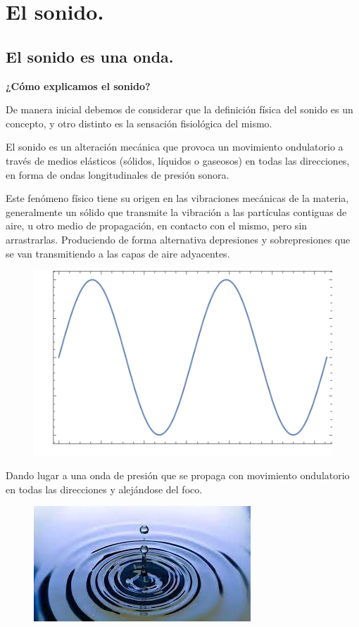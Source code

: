 \documentclass[12pt, letter]{article}
\begin{document}
\section{El sonido.}

\subsection{El sonido es una onda.}


\textbf{¿Cómo explicamos el sonido?}

De manera inicial debemos de considerar que la definición física del sonido es un concepto, y otro distinto es la sensación fisiológica del mismo.

El sonido es un alteración mecánica que provoca un movimiento ondulatorio a través de medios elásticos (sólidos, líquidos o gaseosos) en todas las direcciones, en forma de ondas longitudinales de presión sonora.
\par
Este fenómeno físico tiene su origen en las vibraciones mecánicas de la materia, generalmente un sólido que transmite la vibración a las partículas contiguas de aire, u otro medio de propagación, en contacto con el mismo, pero sin arrastrarlas. Produciendo de forma alternativa depresiones y sobrepresiones que se van transmitiendo a las capas de aire adyacentes.

\begin{figure}[H]
\centering
\includegraphics[scale=0.7]{Imagenes/Plot_Onda_01.png}
\end{figure}

Dando lugar a una onda de presión que se propaga con movimiento ondulatorio en todas las direcciones y alejándose del foco. 

\begin{figure}[H]
\centering
\includegraphics[scale=0.7]{Imagenes/Ondas_04.png}
\end{figure}
\end{document}
